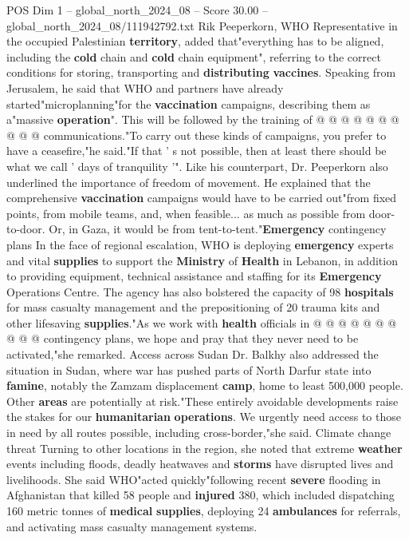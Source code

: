 \begin{textsample}{POS Dim 1 – global\_north\_2024\_08 – Score 30.00 – global\_north\_2024\_08/111942792.txt}
Rik Peeperkorn, WHO Representative in the occupied Palestinian \textbf{territory}, added that"everything has to be aligned, including the \textbf{cold} chain and \textbf{cold} chain equipment", referring to the correct conditions for storing, transporting and \textbf{distributing} \textbf{vaccines}.
Speaking from Jerusalem, he said that WHO and partners have already started"microplanning"for the \textbf{vaccination} campaigns, describing them as a"massive \textbf{operation}".
This will be followed by the training of @ @ @ @ @ @ @ @ @ @ communications."To carry out these kinds of campaigns, you prefer to have a ceasefire,"he said."If that ' s not possible, then at least there should be what we call ' days of tranquility '".
Like his counterpart, Dr.
Peeperkorn also underlined the importance of freedom of movement.
He explained that the comprehensive \textbf{vaccination} campaigns would have to be carried out"from fixed points, from mobile teams, and, when feasible... as much as possible from door-to-door.
Or, in Gaza, it would be from tent-to-tent."\textbf{Emergency} contingency plans In the face of regional escalation, WHO is deploying \textbf{emergency} experts and vital \textbf{supplies} to support the \textbf{Ministry} of \textbf{Health} in Lebanon, in addition to providing equipment, technical assistance and staffing for its \textbf{Emergency} Operations Centre.
The agency has also bolstered the capacity of 98 \textbf{hospitals} for mass casualty management and the prepositioning of 20 trauma kits and other lifesaving \textbf{supplies}."As we work with \textbf{health} officials in @ @ @ @ @ @ @ @ @ @ contingency plans, we hope and pray that they never need to be activated,"she remarked.
Access across Sudan Dr.
Balkhy also addressed the situation in Sudan, where war has pushed parts of North Darfur state into \textbf{famine}, notably the Zamzam displacement \textbf{camp}, home to least 500,000 people.
Other \textbf{areas} are potentially at risk."These entirely avoidable developments raise the stakes for our \textbf{humanitarian} \textbf{operations}.
We urgently need access to those in need by all routes possible, including cross-border,"she said.
Climate change threat Turning to other locations in the region, she noted that extreme \textbf{weather} events including floods, deadly heatwaves and \textbf{storms} have disrupted lives and livelihoods.
She said WHO"acted quickly"following recent \textbf{severe} flooding in Afghanistan that killed 58 people and \textbf{injured} 380, which included dispatching 160 metric tonnes of \textbf{medical} \textbf{supplies}, deploying 24 \textbf{ambulances} for referrals, and activating mass casualty management systems.

\end{textsample}
